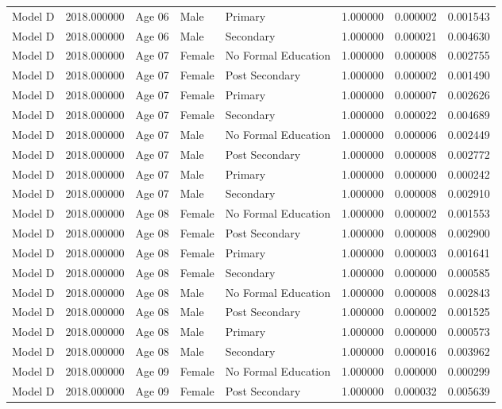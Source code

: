 \begin{table}[ht]
\begin{tabular}{lrlllrrr}
Model D & 2018.000000 & Age 06 & Male & Primary & 1.000000 & 0.000002 & 0.001543 \\
Model D & 2018.000000 & Age 06 & Male & Secondary & 1.000000 & 0.000021 & 0.004630 \\
Model D & 2018.000000 & Age 07 & Female & No Formal Education & 1.000000 & 0.000008 & 0.002755 \\
Model D & 2018.000000 & Age 07 & Female & Post Secondary & 1.000000 & 0.000002 & 0.001490 \\
Model D & 2018.000000 & Age 07 & Female & Primary & 1.000000 & 0.000007 & 0.002626 \\
Model D & 2018.000000 & Age 07 & Female & Secondary & 1.000000 & 0.000022 & 0.004689 \\
Model D & 2018.000000 & Age 07 & Male & No Formal Education & 1.000000 & 0.000006 & 0.002449 \\
Model D & 2018.000000 & Age 07 & Male & Post Secondary & 1.000000 & 0.000008 & 0.002772 \\
Model D & 2018.000000 & Age 07 & Male & Primary & 1.000000 & 0.000000 & 0.000242 \\
Model D & 2018.000000 & Age 07 & Male & Secondary & 1.000000 & 0.000008 & 0.002910 \\
Model D & 2018.000000 & Age 08 & Female & No Formal Education & 1.000000 & 0.000002 & 0.001553 \\
Model D & 2018.000000 & Age 08 & Female & Post Secondary & 1.000000 & 0.000008 & 0.002900 \\
Model D & 2018.000000 & Age 08 & Female & Primary & 1.000000 & 0.000003 & 0.001641 \\
Model D & 2018.000000 & Age 08 & Female & Secondary & 1.000000 & 0.000000 & 0.000585 \\
Model D & 2018.000000 & Age 08 & Male & No Formal Education & 1.000000 & 0.000008 & 0.002843 \\
Model D & 2018.000000 & Age 08 & Male & Post Secondary & 1.000000 & 0.000002 & 0.001525 \\
Model D & 2018.000000 & Age 08 & Male & Primary & 1.000000 & 0.000000 & 0.000573 \\
Model D & 2018.000000 & Age 08 & Male & Secondary & 1.000000 & 0.000016 & 0.003962 \\
Model D & 2018.000000 & Age 09 & Female & No Formal Education & 1.000000 & 0.000000 & 0.000299 \\
Model D & 2018.000000 & Age 09 & Female & Post Secondary & 1.000000 & 0.000032 & 0.005639 \\

\end{tabular}
\end{table}
